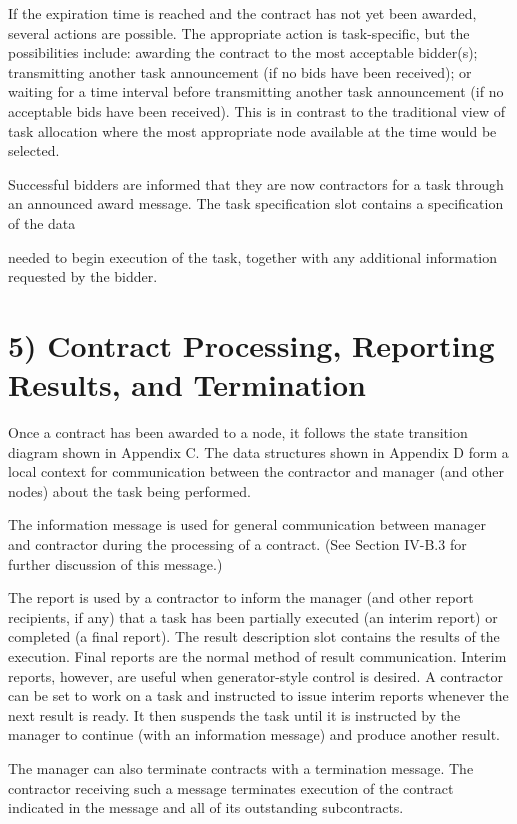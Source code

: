\documentclass[
]{article}
\begin{document}
If the expiration time is reached and the contract has not yet been
awarded, several actions are possible. The appropriate action is
task-specific, but the possibilities include: awarding the contract to
the most acceptable bidder(s); transmitting another task announcement
(if no bids have been received); or waiting for a time interval before
transmitting another task announcement (if no acceptable bids have been
received). This is in contrast to the traditional view of task
allocation where the most appropriate node available at the time would
be selected.

Successful bidders are informed that they are now contractors for a task
through an announced award message. The task specification slot contains
a specification of the data

needed to begin execution of the task, together with any additional
information requested by the bidder.

\section{5) Contract Processing, Reporting Results, and
Termination}\label{contract-processing-reporting-results-and-termination}

Once a contract has been awarded to a node, it follows the state
transition diagram shown in Appendix C. The data structures shown in
Appendix D form a local context for communication between the contractor
and manager (and other nodes) about the task being performed.

The information message is used for general communication between
manager and contractor during the processing of a contract. (See Section
IV-B.3 for further discussion of this message.)

The report is used by a contractor to inform the manager (and other
report recipients, if any) that a task has been partially executed (an
interim report) or completed (a final report). The result description
slot contains the results of the execution. Final reports are the normal
method of result communication. Interim reports, however, are useful
when generator-style control is desired. A contractor can be set to work
on a task and instructed to issue interim reports whenever the next
result is ready. It then suspends the task until it is instructed by the
manager to continue (with an information message) and produce another
result.

The manager can also terminate contracts with a termination message. The
contractor receiving such a message terminates execution of the contract
indicated in the message and all of its outstanding subcontracts.
\end{document}
